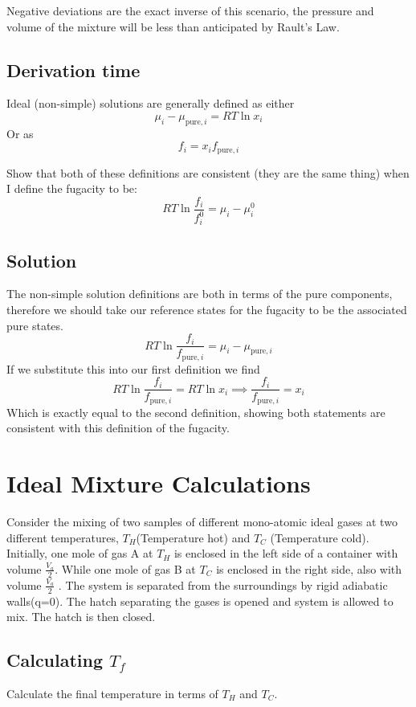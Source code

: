 \documentclass{article}
\newcommand{\be}{\begin{equation}}
\newcommand{\ee}{\end{equation}}
\begin{document}
Negative deviations are the exact inverse of this scenario, the pressure and volume of the mixture will be less than anticipated by Rault's Law. 

\subsection{Derivation time}
Ideal (non-simple) solutions are generally defined as either
\be
\mu_i - \mu_{\text{pure},i} = RT\ln x_i
\ee
Or as
\be
f_i = x_i f_{\text{pure},i}
\ee

Show that both of these definitions are consistent (they are the same thing) when I define the fugacity to be:
\be
RT\ln\frac{f_i}{f_i^0} = \mu_i - \mu_i^0
\ee

\subsection*{Solution}
The non-simple solution definitions are both in terms of the pure components, therefore we should take our reference states for the fugacity to be the associated pure states. 
\be
RT\ln\frac{f_i}{f_{\text{pure},i}} = \mu_i - \mu_{\text{pure},i}
\ee
If we substitute this into our first definition we find
\be
RT\ln\frac{f_i}{f_{\text{pure},i}} =  RT\ln x_i \implies \frac{f_i}{f_{\text{pure},i}} = x_i
\ee
Which is exactly equal to the second definition, showing both statements are consistent with this definition of the fugacity. 

\section{Ideal Mixture Calculations}
Consider the mixing of two samples of different mono-atomic ideal gases at two different
temperatures, $T_H$(Temperature hot) and $T_C$ (Temperature cold). 
Initially, one mole of gas A at $T_H$ is enclosed in the left side of a container with volume $\frac{V_a}{2}$. 
While one mole of gas B at $T_C$ is enclosed in the right side, also with volume $\frac{V_a}{2}$ . 
The system is separated from the surroundings by rigid adiabatic walls(q=0). 
The hatch separating the gases is opened and system is allowed to mix. The hatch is then closed.
\subsection{Calculating $T_f$}
Calculate the final temperature in terms of $T_H$ and $T_C$. 
\bigskip
\end{document}
